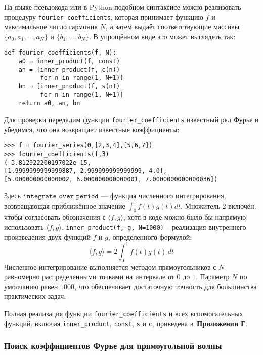\documentclass[bachelor, och, diploma]{SCWorks}
\begin{document}
На языке псевдокода или в Python-подобном синтаксисе можно реализовать процедуру \texttt{fourier\_coefficients}, которая принимает функцию \(f\) и максимальное число гармоник \(N\), а затем выдаёт соответствующие массивы \(\{a_0, a_1, \dots, a_N\}\) и \(\{b_1, \dots, b_N\}\). В упрощённом виде это может выглядеть так:

\begin{verbatim}
def fourier_coefficients(f, N):
    a0 = inner_product(f, const)
    an = [inner_product(f, c(n))
          for n in range(1, N+1)]
    bn = [inner_product(f, s(n))
          for n in range(1, N+1)]
    return a0, an, bn
\end{verbatim}

Для проверки передадим функции \texttt{fourier\_coefficients} известный ряд Фурье и убедимся, что она возвращает известные коэффициенты:

\begin{verbatim}
>>> f = fourier_series(0,[2,3,4],[5,6,7])
>>> fourier_coefficients(f,3)
(-3.812922200197022e-15,
[1.9999999999999887, 2.999999999999999, 4.0],
[5.000000000000002, 6.000000000000001, 7.0000000000000036])
\end{verbatim}

Здесь \(\texttt{integrate\_over\_period}\) — функция численного интегрирования, возвращающая приближённое значение $\int_0^1 f(t) g(t) dt$. Множитель 2 включён, чтобы согласовать обозначения с \(\langle f,g\rangle\), хотя в коде можно было бы напрямую использовать \(\langle f,g\rangle\). \texttt{inner\_product(f, g, N=1000)} -- реализация внутреннего произведения двух функций $f$ и $g$, определенного формулой:
    \[
    \langle f, g \rangle = 2 \int_0^1 f(t) g(t) \, dt
    \]
    Численное интегрирование выполняется методом прямоугольников с $N$ равномерно распределенными точками на интервале от $0$ до $1$. Параметр $N$ по умолчанию равен $1000$, что обеспечивает достаточную точность для большинства практических задач.
     
Полная реализация функции \texttt{fourier\_coefficients} и всех вспомогательных функций, включая \texttt{inner\_product}, \texttt{const}, \texttt{s} и \texttt{c}, приведена в~\textbf{Приложении Г}.

\subsubsection{Поиск коэффициентов Фурье для прямоугольной волны}
\end{document}
